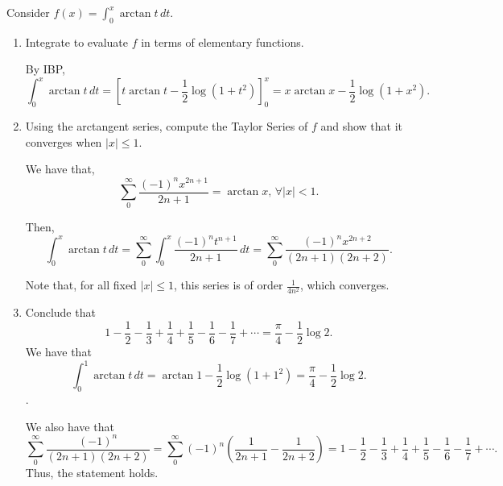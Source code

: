 \documentclass[../hw3]{subfiles}
\begin{document}
\begin{problem}
Consider $f(x)=\int_{0}^{x} \arctan{t}  \,dt$.
\end{problem}
\begin{enumerate}[label=\alph*)]
	\item Integrate to evaluate $f$ in terms of elementary functions.

	      By IBP, \[
		      \int_{0}^{x} \arctan{t}  \,dt  = \left[ t\arctan{t}-\frac{1}{2}\log{(1+t^2)}   \right]_0^x = x\arctan{x}-\frac{1}{2}\log{(1+x^2)}
		      .\]

	\item Using the arctangent series, compute the Taylor Series of $f$ and show that it converges when $|x| \le 1$.

	      We have that, \[
		      \sum_{0}^{\infty} \frac{(-1)^n x^{2n+1}}{2n+1} = \arctan{x},\,  \forall |x|<1
		      .\]

	      Then, \[
		      \int_{0}^{x} \arctan{t}  \,dt = \sum_{0}^{\infty} \int_{0}^{x} \frac{(-1)^nt^{n+1}}{2n+1} \,dt = \sum_{0}^{\infty} \frac{(-1)^n x^{2n+2}}{(2n+1)(2n+2)}
		      .\]

	      Note that, for all fixed $|x|\le 1$, this series is of order  $\frac{1}{4n^2}$, which converges.

	\item Conclude that \[
		      1-\frac{1}{2} - \frac{1}{3}  + \frac{1}{4} + \frac{1}{5}  - \frac{1}{6}  - \frac{1}{7}  + \cdots = \frac{\pi}{4} - \frac{1}{2}\log{2}
		      .\]
	      We have that \[
		      \int_{0}^{1} \arctan{t}  \,dt = \arctan{1}-\frac{1}{2}\log{(1+1^2)}  = \frac{\pi}{4}-\frac{1}{2}\log{2}
		      .\] .

	      We also have that \[
		      \sum_{0}^{\infty} \frac{(-1)^n}{(2n+1)(2n+2)} = \sum_{0}^{\infty} (-1)^n \left( \frac{1}{2n+1} - \frac{1}{2n+2}\right) = 1-\frac{1}{2} - \frac{1}{3}  + \frac{1}{4} + \frac{1}{5}  - \frac{1}{6}  - \frac{1}{7}  + \cdots
		      .\]
	      Thus, the statement holds.
\end{enumerate}
\end{document}
